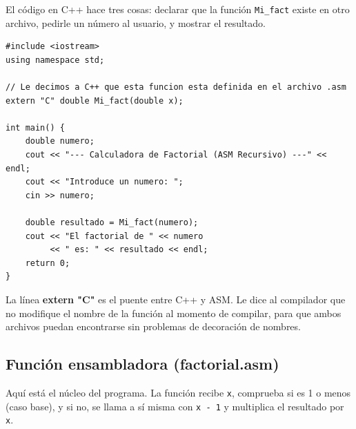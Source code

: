 \documentclass[12pt, letterpaper]{article}
\begin{document}
El código en C++ hace tres cosas: declarar que la función \texttt{Mi\_fact} existe en otro archivo, pedirle un número al usuario, y mostrar el resultado.

\begin{lstlisting}[style=cpp, caption={main.cpp --- Entrada, salida y llamada a la función ASM}]
#include <iostream>
using namespace std;

// Le decimos a C++ que esta funcion esta definida en el archivo .asm
extern "C" double Mi_fact(double x);

int main() {
    double numero;
    cout << "--- Calculadora de Factorial (ASM Recursivo) ---" << endl;
    cout << "Introduce un numero: ";
    cin >> numero;

    double resultado = Mi_fact(numero);
    cout << "El factorial de " << numero
         << " es: " << resultado << endl;
    return 0;
}
\end{lstlisting}

La línea \textbf{extern "C"} es el puente entre C++ y ASM. Le dice al compilador que no modifique el nombre de la función al momento de compilar, para que ambos archivos puedan encontrarse sin problemas de decoración de nombres.

\subsection{Función ensambladora (factorial.asm)}

Aquí está el núcleo del programa. La función recibe \texttt{x}, comprueba si es 1 o menos (caso base), y si no, se llama a sí misma con \texttt{x - 1} y multiplica el resultado por \texttt{x}.
\end{document}
